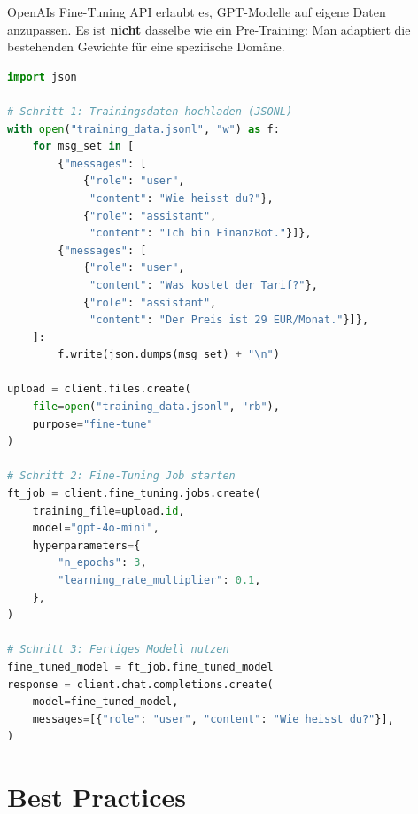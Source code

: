 OpenAIs Fine-Tuning API erlaubt es, GPT-Modelle auf eigene Daten anzupassen. Es ist \textbf{nicht} dasselbe wie ein Pre-Training: Man adaptiert die bestehenden Gewichte für eine spezifische Domäne.

\begin{lstlisting}[language=Python, caption={Fine-Tuning mit OpenAI}, label=lst:finetune]
import json

# Schritt 1: Trainingsdaten hochladen (JSONL)
with open("training_data.jsonl", "w") as f:
    for msg_set in [
        {"messages": [
            {"role": "user",
             "content": "Wie heisst du?"},
            {"role": "assistant",
             "content": "Ich bin FinanzBot."}]},
        {"messages": [
            {"role": "user",
             "content": "Was kostet der Tarif?"},
            {"role": "assistant",
             "content": "Der Preis ist 29 EUR/Monat."}]},
    ]:
        f.write(json.dumps(msg_set) + "\n")

upload = client.files.create(
    file=open("training_data.jsonl", "rb"),
    purpose="fine-tune"
)

# Schritt 2: Fine-Tuning Job starten
ft_job = client.fine_tuning.jobs.create(
    training_file=upload.id,
    model="gpt-4o-mini",
    hyperparameters={
        "n_epochs": 3,
        "learning_rate_multiplier": 0.1,
    },
)

# Schritt 3: Fertiges Modell nutzen
fine_tuned_model = ft_job.fine_tuned_model
response = client.chat.completions.create(
    model=fine_tuned_model,
    messages=[{"role": "user", "content": "Wie heisst du?"}],
)
\end{lstlisting}


\section{Best Practices}

